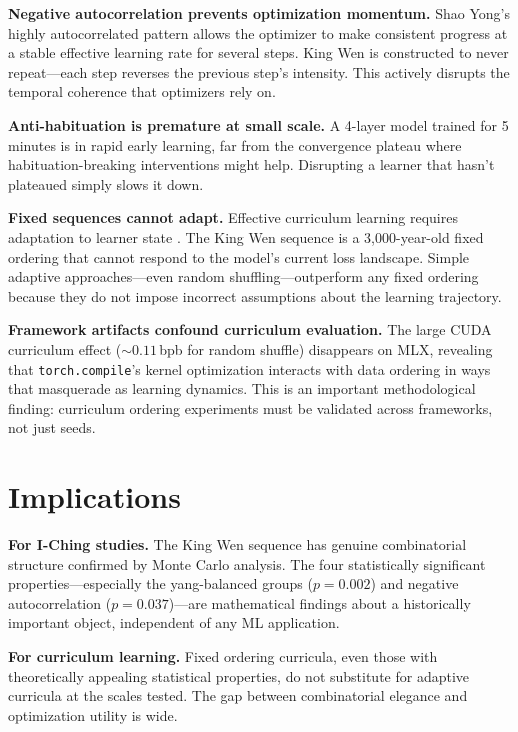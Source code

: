 \documentclass{article}
\begin{document}
\textbf{Negative autocorrelation prevents optimization momentum.} Shao Yong's highly autocorrelated pattern allows the optimizer to make consistent progress at a stable effective learning rate for several steps. King Wen is constructed to never repeat---each step reverses the previous step's intensity. This actively disrupts the temporal coherence that optimizers rely on.

\textbf{Anti-habituation is premature at small scale.} A 4-layer model trained for 5 minutes is in rapid early learning, far from the convergence plateau where habituation-breaking interventions might help. Disrupting a learner that hasn't plateaued simply slows it down.

\textbf{Fixed sequences cannot adapt.} Effective curriculum learning requires adaptation to learner state \cite{graves2017automated}. The King Wen sequence is a 3,000-year-old fixed ordering that cannot respond to the model's current loss landscape. Simple adaptive approaches---even random shuffling---outperform any fixed ordering because they do not impose incorrect assumptions about the learning trajectory.

\textbf{Framework artifacts confound curriculum evaluation.} The large CUDA curriculum effect (${\sim}0.11$\,bpb for random shuffle) disappears on MLX, revealing that \texttt{torch.compile}'s kernel optimization interacts with data ordering in ways that masquerade as learning dynamics. This is an important methodological finding: curriculum ordering experiments must be validated across frameworks, not just seeds.

\section{Implications}\label{sec:implications}

\textbf{For I-Ching studies.} The King Wen sequence has genuine combinatorial structure confirmed by Monte Carlo analysis. The four statistically significant properties---especially the yang-balanced groups ($p = 0.002$) and negative autocorrelation ($p = 0.037$)---are mathematical findings about a historically important object, independent of any ML application.

\textbf{For curriculum learning.} Fixed ordering curricula, even those with theoretically appealing statistical properties, do not substitute for adaptive curricula at the scales tested. The gap between combinatorial elegance and optimization utility is wide.
\end{document}
